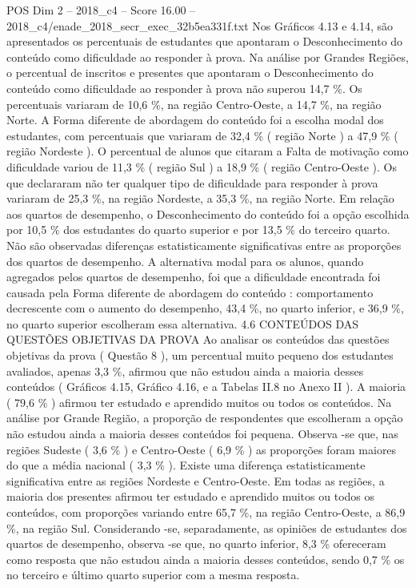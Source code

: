 \begin{textsample}{POS Dim 2 – 2018\_c4 – Score 16.00 – 2018\_c4/enade\_2018\_secr\_exec\_32b5ea331f.txt}
Nos Gráficos 4.13 e 4.14, são apresentados os percentuais de estudantes que apontaram o Desconhecimento do conteúdo como dificuldade ao responder à prova.
Na análise por Grandes Regiões, o percentual de inscritos e presentes que apontaram o Desconhecimento do conteúdo como dificuldade ao responder à prova não superou 14,7 \%.
Os percentuais variaram de 10,6 \%, na região Centro-Oeste, a 14,7 \%, na região Norte.
A Forma diferente de abordagem do conteúdo foi a escolha modal dos estudantes, com percentuais que variaram de 32,4 \% ( região Norte ) a 47,9 \% ( região Nordeste ).
O percentual de alunos que citaram a Falta de motivação como dificuldade variou de 11,3 \% ( região Sul ) a 18,9 \% ( região Centro-Oeste ).
Os que declararam não ter qualquer tipo de dificuldade para responder à prova variaram de 25,3 \%, na região Nordeste, a 35,3 \%, na região Norte.
Em relação aos quartos de desempenho, o Desconhecimento do conteúdo foi a opção escolhida por 10,5 \% dos estudantes do quarto superior e por 13,5 \% do terceiro quarto.
Não são observadas diferenças estatisticamente significativas entre as proporções dos quartos de desempenho.
A alternativa modal para os alunos, quando agregados pelos quartos de desempenho, foi que a dificuldade encontrada foi causada pela Forma diferente de abordagem do conteúdo : comportamento decrescente com o aumento do desempenho, 43,4 \%, no quarto inferior, e 36,9 \%, no quarto superior escolheram essa alternativa. 4.6 CONTEÚDOS DAS QUESTÕES OBJETIVAS DA PROVA Ao analisar os conteúdos das questões objetivas da prova ( Questão 8 ), um percentual muito pequeno dos estudantes avaliados, apenas 3,3 \%, afirmou que não estudou ainda a maioria desses conteúdos ( Gráficos 4.15, Gráfico 4.16, e a Tabelas II.8 no Anexo II ).
A maioria ( 79,6 \% ) afirmou ter estudado e aprendido muitos ou todos os conteúdos.
Na análise por Grande Região, a proporção de respondentes que escolheram a opção não estudou ainda a maioria desses conteúdos foi pequena.
Observa -se que, nas regiões Sudeste ( 3,6 \% ) e Centro-Oeste ( 6,9 \% ) as proporções foram maiores do que a média nacional ( 3,3 \% ).
Existe uma diferença estatisticamente significativa entre as regiões Nordeste e Centro-Oeste.
Em todas as regiões, a maioria dos presentes afirmou ter estudado e aprendido muitos ou todos os conteúdos, com proporções variando entre 65,7 \%, na região Centro-Oeste, a 86,9 \%, na região Sul.
Considerando -se, separadamente, as opiniões de estudantes dos quartos de desempenho, observa -se que, no quarto inferior, 8,3 \% ofereceram como resposta que não estudou ainda a maioria desses conteúdos, sendo 0,7 \% os no terceiro e último quarto superior com a mesma resposta.

\end{textsample}
